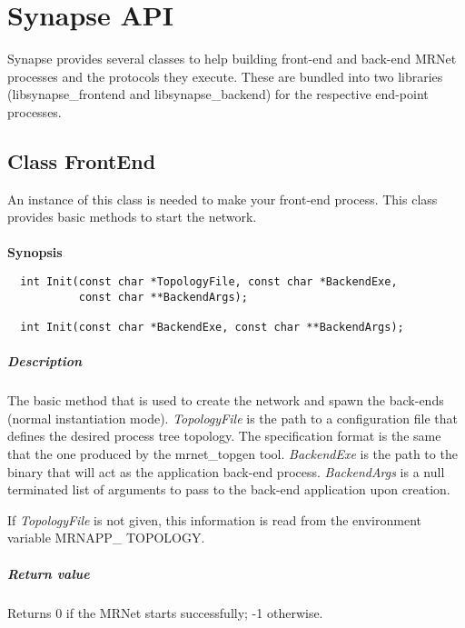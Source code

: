 \documentclass[twoside,a4,english,11pt]{book}
\begin{document}
\chapter{Synapse API}
\label{sec:API}

Synapse provides several classes to help building front-end and back-end MRNet processes and the protocols they execute. These are 
bundled into two libraries (libsynapse\_frontend and libsynapse\_backend) for the respective end-point processes. 

\section{Class FrontEnd}

An instance of this class is needed to make your front-end process. This class provides basic methods to start the network.

\subsubsection{}

\textbf{Synopsis}

\begin{lstlisting}
  int Init(const char *TopologyFile, const char *BackendExe, 
           const char **BackendArgs); 

  int Init(const char *BackendExe, const char **BackendArgs);
\end{lstlisting}

\paragraph{Description}
  The basic method that is used to create the network and spawn the back-ends (normal instantiation mode). \emph{TopologyFile} is the path to a 
  configuration file that defines the desired process tree topology. The specification format is the same that the one produced by the 
  mrnet\_topgen tool. \emph{BackendExe} is the path to the binary that will act as the application back-end process. \emph{BackendArgs} is a null 
  terminated list of arguments to pass to the back-end application upon creation.

  If \emph{TopologyFile} is not given, this information is read from the environment variable MRNAPP\_ TOPOLOGY.
  
\paragraph{Return value}
  Returns 0 if the MRNet starts successfully; -1 otherwise.
\end{document}
